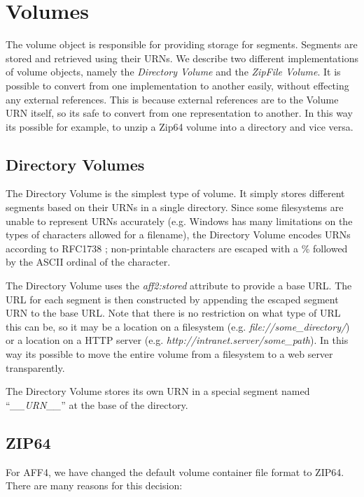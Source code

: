 \documentclass[10pt, conference]{IEEEtran}
\begin{document}
\section{Volumes}
The volume object is responsible for providing storage for
segments. Segments are stored and retrieved using their URNs. We
describe two different implementations of volume objects, namely the
{\em Directory Volume} and the {\em ZipFile Volume}. It is possible to
convert from one implementation to another easily, without effecting
any external references. This is because external references are to
the Volume URN itself, so its safe to convert from one representation
to another. In this way its possible for example, to unzip a Zip64
volume into a directory and vice versa.

\subsection{Directory Volumes}
The Directory Volume is the simplest type of volume. It simply stores
different segments based on their URNs in a single directory. Since
some filesystems are unable to represent URNs accurately (e.g. Windows
has many limitations on the types of characters allowed for a
filename), the Directory Volume encodes URNs according to RFC1738
\cite{RFC1738}; non-printable characters are escaped with a \%
followed by the ASCII ordinal of the character.

The Directory Volume uses the {\em aff2:stored} attribute to provide a
base URL. The URL for each segment is then constructed by appending
the escaped segment URN to the base URL. Note that there is no
restriction on what type of URL this can be, so it may be a location
on a filesystem (e.g. {\em file://some\_directory/}) or a location on a
HTTP server (e.g. {\em http://intranet.server/some\_path}). In this
way its possible to move the entire volume from a filesystem to a web
server transparently.

The Directory Volume stores its own URN in a special segment named
``{\em \_\_URN\_\_}'' at the base of the directory.

\subsection{ZIP64}
For AFF4, we have changed the default volume container file format to
ZIP64\cite{zipspecs}. There are many reasons for this decision:
\end{document}
